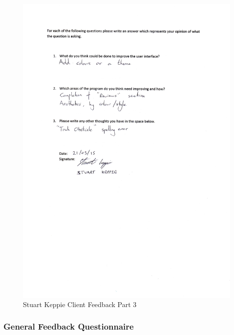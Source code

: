 \begin{figure}[H]
    \includegraphics[width=\textwidth]{./Evaluation/images/StuFeedback3.pdf}
    \caption{Stuart Keppie Client Feedback Part 3} \label{fig:StuFeedback3}
\end{figure}

\subsubsection{General Feedback Questionnaire}

